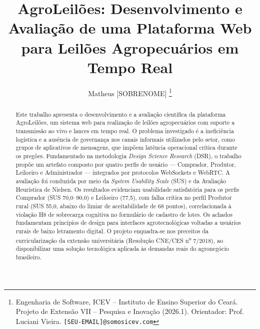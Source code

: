 \documentclass[12pt]{article}
\title{AgroLeilões: Desenvolvimento e Avaliação de uma Plataforma Web\\
       para Leilões Agropecuários em Tempo Real}
\author{Matheus [SOBRENOME]%
  \thanks{Engenharia de Software, ICEV -- Instituto de Ensino Superior do Ceará.
  Projeto de Extensão VII -- Pesquisa e Inovação (2026.1).
  Orientador: Prof. Luciani Vieira.
  \texttt{[SEU-EMAIL]@somosicev.com}}}
\begin{document}
\maketitle

\begin{abstract}
Este trabalho apresenta o desenvolvimento e a avaliação científica da plataforma
AgroLeilões, um sistema web para realização de leilões agropecuários com suporte a
transmissão ao vivo e lances em tempo real. O problema investigado é a ineficiência
logística e a ausência de governança nos canais informais utilizados pelo setor, como
grupos de aplicativos de mensagens, que impõem latência operacional crítica durante os
pregões. Fundamentado na metodologia \textit{Design Science Research} (DSR), o trabalho
propõe um artefato composto por quatro perfis de usuário --- Comprador, Produtor,
Leiloeiro e Administrador --- integrados por protocolos WebSockets e WebRTC. A avaliação
foi conduzida por meio da \textit{System Usability Scale} (SUS) e da Avaliação
Heurística de Nielsen. Os resultados evidenciam usabilidade satisfatória para os perfis
Comprador (SUS 70,0--90,0) e Leiloeiro (77,5), com falha crítica no perfil Produtor
rural (SUS 55,0, abaixo do limiar de aceitabilidade de 68 pontos), correlacionada à
violação H8 de sobrecarga cognitiva no formulário de cadastro de lotes. Os achados
fundamentam princípios de design para interfaces agrotecnológicas voltadas a usuários
rurais de baixo letramento digital. O projeto enquadra-se nos preceitos da
curricularização da extensão universitária (Resolução CNE/CES
n\textsuperscript{o} 7/2018), ao disponibilizar uma solução tecnológica aplicada às
demandas reais do agronegócio brasileiro.
\end{abstract}
\end{document}
